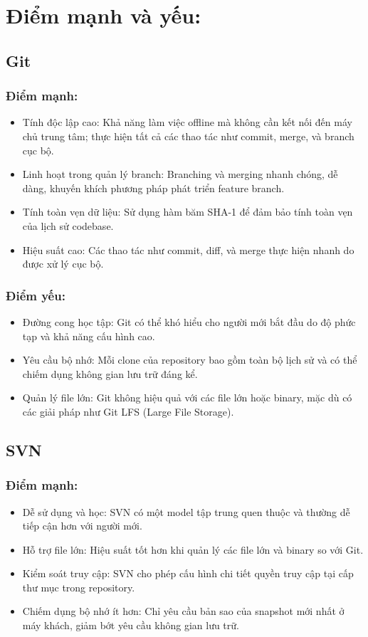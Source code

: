 \section{Điểm mạnh và yếu:}
\subsection{Git}
\subsubsection{Điểm mạnh:}
\begin{itemize}
    \item Tính độc lập cao: Khả năng làm việc offline mà không cần kết nối đến máy chủ trung tâm; thực hiện tất cả các thao tác như commit, merge, và branch cục bộ.
    \item Linh hoạt trong quản lý branch: Branching và merging nhanh chóng, dễ dàng, khuyến khích phương pháp phát triển feature branch.
    \item Tính toàn vẹn dữ liệu: Sử dụng hàm băm SHA-1 để đảm bảo tính toàn vẹn của lịch sử codebase.
    \item Hiệu suất cao: Các thao tác như commit, diff, và merge thực hiện nhanh do được xử lý cục bộ.
\end{itemize}

\subsubsection{Điểm yếu:}
\begin{itemize}
    \item Đường cong học tập: Git có thể khó hiểu cho người mới bắt đầu do độ phức tạp và khả năng cấu hình cao.
    \item Yêu cầu bộ nhớ: Mỗi clone của repository bao gồm toàn bộ lịch sử và có thể chiếm dụng không gian lưu trữ đáng kể.
    \item Quản lý file lớn: Git không hiệu quả với các file lớn hoặc binary, mặc dù có các giải pháp như Git LFS (Large File Storage).
\end{itemize}

\subsection{SVN}
\subsubsection{Điểm mạnh:}
\begin{itemize}
    \item Dễ sử dụng và học: SVN có một model tập trung quen thuộc và thường dễ tiếp cận hơn với người mới.
    \item Hỗ trợ file lớn: Hiệu suất tốt hơn khi quản lý các file lớn và binary so với Git.
    \item Kiểm soát truy cập: SVN cho phép cấu hình chi tiết quyền truy cập tại cấp thư mục trong repository.
    \item Chiếm dụng bộ nhớ ít hơn: Chỉ yêu cầu bản sao của snapshot mới nhất ở máy khách, giảm bớt yêu cầu không gian lưu trữ.
\end{itemize}

